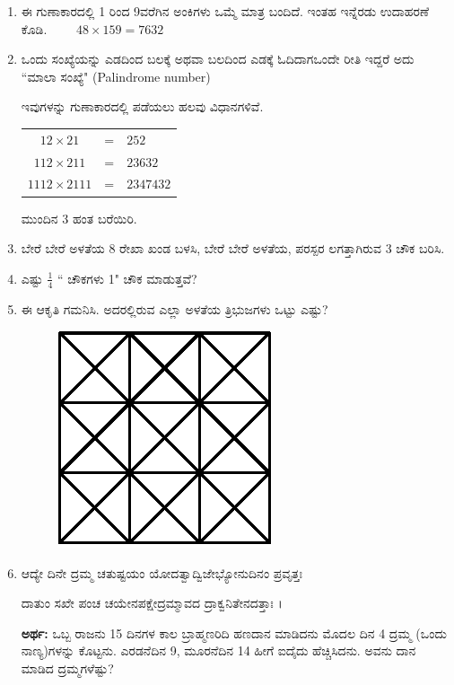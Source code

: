 \begin{enumerate}
\item ಈ ಗುಣಾಕಾರದಲ್ಲಿ 1 ರಿಂದ 9ವರೆಗಿನ ಅಂಕಿಗಳು ಒಮ್ಮೆ ಮಾತ್ರ ಬಂದಿದೆ. ಇಂತಹ ಇನ್ನೆರಡು ಉದಾಹರಣೆ ಕೊಡಿ. $\qquad 48\times 159 = 7632$


\item ಒಂದು ಸಂಖ್ಯೆಯನ್ನು ಎಡದಿಂದ ಬಲಕ್ಕೆ ಅಥವಾ ಬಲದಿಂದ ಎಡಕ್ಕೆ ಓದಿದಾಗ\break ಒಂದೇ ರೀತಿ ಇದ್ದರೆ ಅದು ``ಮಾಲಾ ಸಂಖ್ಯೆ" (Palindrome number)

ಇವುಗಳನ್ನು ಗುಣಾಕಾರದಲ್ಲಿ ಪಡೆಯಲು ಹಲವು ವಿಧಾನಗಳಿವೆ. 

\begin{tabular}[t]{c@{\;}c@{\;}l}
$12\times 21$ & = & $252$\\
$112\times 211$ & = & $23632$\\
$1112\times 2111$ & = & $2347432$
\end{tabular}

\vskip 0.1cm

ಮುಂದಿನ 3 ಹಂತ ಬರೆಯಿರಿ. 

\item ಬೇರೆ ಬೇರೆ ಅಳತೆಯ 8 ರೇಖಾ ಖಂಡ ಬಳಸಿ, ಬೇರೆ ಬೇರೆ ಅಳತೆಯ, ಪರಸ್ಪರ ಲಗತ್ತಾಗಿರುವ 3 ಚೌಕ ಬರಿಸಿ.

\item ಎಷ್ಟು $\frac{1}{4}$ `` ಚೌಕಗಳು 1" ಚೌಕ ಮಾಡುತ್ತವೆ? 

\item ಈ ಆಕೃತಿ ಗಮನಿಸಿ. ಅದರಲ್ಲಿರುವ ಎಲ್ಲಾ ಅಳತೆಯ ತ್ರಿಭುಜಗಳು ಒಟ್ಟು ಎಷ್ಟು? 

\begin{figure}[H]
\centering
\includegraphics[scale=1.3]{images/chap8/q20.eps}
\end{figure}

\vskip -0.4cm

\item ಆದ್ಯೇ ದಿನೇ ದ್ರಮ್ಮ ಚತುಷ್ಟಯಂ ಯೋದತ್ವಾದ್ವಿಜೇಭ್ಯೋನುದಿನಂ ಪ್ರವೃತ್ತಃ 

ದಾತುಂ ಸಖೇ ಪಂಚ ಚಯೇನಪಕ್ಷೇದ್ರಮ್ಮಾವದ ದ್ರಾಕ್ವನಿತೇನದತ್ತಾಃ ।


{\bf ಅರ್ಥ:} ಒಬ್ಬ ರಾಜನು 15 ದಿನಗಳ ಕಾಲ ಬ್ರಾಹ್ಮಣರಿದಿ ಹಣದಾನ ಮಾಡಿದನು ಮೊದಲ ದಿನ 4 ದ್ರಮ್ಮ (ಒಂದು ನಾಣ್ಯ)ಗಳನ್ನು ಕೊಟ್ಟನು. ಎರಡನೆದಿನ 9, ಮೂರನೆದಿನ 14 ಹೀಗೆ ಐದೈದು ಹೆಚ್ಚಿಸಿದನು. ಅವನು ದಾನ ಮಾಡಿದ ದ್ರಮ್ಮಗಳೆಷ್ಟು? 


\end{enumerate}
